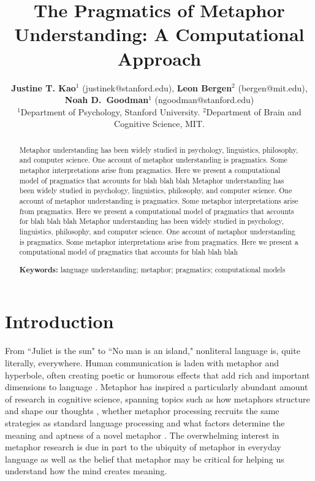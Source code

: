 \documentclass[10pt,letterpaper]{article}
\title{The Pragmatics of Metaphor Understanding: A Computational Approach}
\author{{\large {\bf Justine T. Kao$^1$} (justinek@stanford.edu)}, {\large {\bf Leon Bergen$^2$} (bergen@mit.edu)}, {\large {\bf Noah D.~Goodman$^1$} (ngoodman@stanford.edu)}\\
  $^1$Department of Psychology, Stanford University. $^2$Department of Brain and Cognitive Science, MIT. }
\begin{document}
\maketitle
\begin{abstract}
Metaphor understanding has been widely studied in psychology, linguistics, philosophy, and computer science. One account of metaphor understanding is pragmatics. Some metaphor interpretations arise from pragmatics. Here we present a computational model of pragmatics that accounts for blah blah blah
Metaphor understanding has been widely studied in psychology, linguistics, philosophy, and computer science. One account of metaphor understanding is pragmatics. Some metaphor interpretations arise from pragmatics. Here we present a computational model of pragmatics that accounts for blah blah blah
Metaphor understanding has been widely studied in psychology, linguistics, philosophy, and computer science. One account of metaphor understanding is pragmatics. Some metaphor interpretations arise from pragmatics. Here we present a computational model of pragmatics that accounts for blah blah blah

\textbf{Keywords:} 
language understanding; metaphor; pragmatics; computational models
\end{abstract}


\section{Introduction}
From ``Juliet is the sun" to ``No man is an island," nonliteral language is, quite literally, everywhere. Human communication is laden with metaphor and hyperbole, often creating poetic or humorous effects that add rich and important dimensions to language \cite{glucksberg2001understanding, pilkington2000poetic, lakoff2009more, roberts1994people, bergen2003cognitive}. Metaphor has inspired a particularly abundant amount of research in cognitive science, spanning topics such as how metaphors structure and shape our thoughts \cite{ortony1993metaphor, lakoff1993contemporary, thibodeau2011metaphors}, whether metaphor processing recruits the same strategies as standard language processing \cite{giora1997understanding, ortony1978interpreting, gibbs2002new, glucksberg1993metaphors} and what factors determine the meaning and aptness of a novel metaphor \cite{blasko1993effects, tourangeau1981aptness, kintsch2002metaphor}. The overwhelming interest in metaphor research is due in part to the ubiquity of metaphor in everyday language as well as the belief that metaphor may be critical for helping us understand how the mind creates meaning. 
\end{document}
